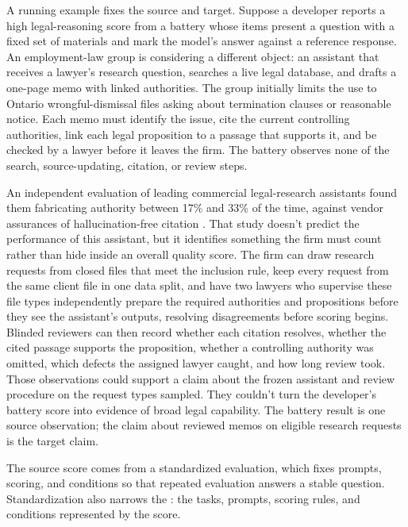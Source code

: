 \documentclass[12pt]{article}
\begin{document}
A running example fixes the source and target. Suppose a developer reports a high legal-reasoning score from a battery whose items present a question with a fixed set of materials and mark the model's answer against a reference response. An employment-law group is considering a different object: an assistant that receives a lawyer's research question, searches a live legal database, and drafts a one-page memo with linked authorities. The group initially limits the use to Ontario wrongful-dismissal files asking about termination clauses or reasonable notice. Each memo must identify the issue, cite the current controlling authorities, link each legal proposition to a passage that supports it, and be checked by a lawyer before it leaves the firm. The battery observes none of the search, source-updating, citation, or review steps.

An independent evaluation of leading commercial legal-research assistants found them fabricating authority between 17\% and 33\% of the time, against vendor assurances of hallucination-free citation \citep{magesh2025legalhallucination}. That study doesn't predict the performance of this assistant, but it identifies something the firm must count rather than hide inside an overall quality score. The firm can draw research requests from closed files that meet the inclusion rule, keep every request from the same client file in one data split, and have two lawyers who supervise these file types independently prepare the required authorities and propositions before they see the assistant's outputs, resolving disagreements before scoring begins. Blinded reviewers can then record whether each citation resolves, whether the cited passage supports the proposition, whether a controlling authority was omitted, which defects the assigned lawyer caught, and how long review took. Those observations could support a claim about the frozen assistant and review procedure on the request types sampled. They couldn't turn the developer's battery score into evidence of broad legal capability. The battery result is one source observation; the claim about reviewed memos on eligible research requests is the target claim.

The source score comes from a standardized evaluation, which fixes prompts, scoring, and conditions so that repeated evaluation answers a stable question. Standardization also narrows the : the tasks, prompts, scoring rules, and conditions represented by the score.
\end{document}
